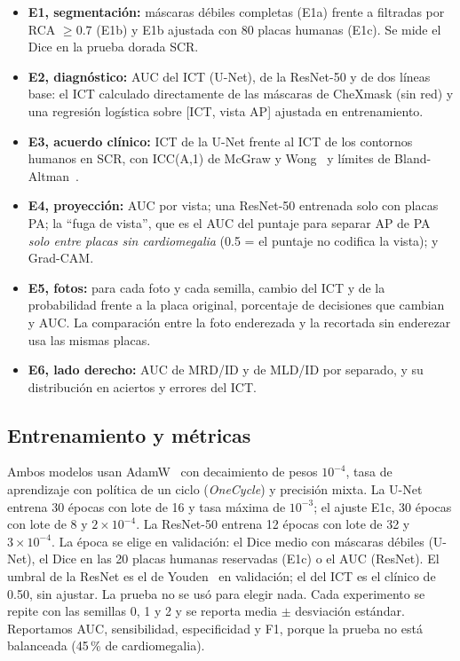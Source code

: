 \documentclass[conference]{IEEEtran}
\begin{document}
\begin{itemize}
\item \textbf{E1, segmentación:} máscaras débiles completas (E1a) frente a filtradas por RCA $\geq0.7$ (E1b) y E1b
  ajustada con 80 placas humanas (E1c). Se mide el Dice en la prueba dorada SCR.
\item \textbf{E2, diagnóstico:} AUC del ICT (U-Net), de la ResNet-50 y de dos líneas base: el ICT calculado
  directamente de las máscaras de CheXmask (sin red) y una regresión logística sobre [ICT, vista AP] ajustada en
  entrenamiento.
\item \textbf{E3, acuerdo clínico:} ICT de la U-Net frente al ICT de los contornos humanos en SCR, con ICC(A,1)
  de McGraw y Wong~\cite{mcgraw1996icc} y límites de Bland-Altman~\cite{bland1986agreement}.
\item \textbf{E4, proyección:} AUC por vista; una ResNet-50 entrenada solo con placas PA; la ``fuga de vista'', que es
  el AUC del puntaje para separar AP de PA \emph{solo entre placas sin cardiomegalia} (0.5 = el puntaje no codifica la
  vista); y Grad-CAM.
\item \textbf{E5, fotos:} para cada foto y cada semilla, cambio del ICT y de la probabilidad frente a la placa original,
  porcentaje de decisiones que cambian y AUC. La comparación entre la foto enderezada y la recortada sin enderezar usa
  las mismas placas.
\item \textbf{E6, lado derecho:} AUC de MRD/ID y de MLD/ID por separado, y su distribución en aciertos y errores del
  ICT.
\end{itemize}

\subsection{Entrenamiento y métricas}

Ambos modelos usan AdamW~\cite{loshchilov2019adamw} con decaimiento de pesos $10^{-4}$, tasa de aprendizaje con
política de un ciclo (\emph{OneCycle}) y precisión mixta. La U-Net entrena 30 épocas con lote de 16 y tasa máxima de
$10^{-3}$; el ajuste E1c, 30 épocas con lote de 8 y $2\times10^{-4}$. La ResNet-50 entrena 12 épocas con lote de 32 y
$3\times10^{-4}$. La época se elige en validación: el Dice medio con máscaras débiles (U-Net), el Dice en las 20 placas
humanas reservadas (E1c) o el AUC (ResNet). El umbral de la ResNet es el de Youden~\cite{youden1950index} en
validación; el del ICT es el clínico de 0.50, sin ajustar. La prueba no se usó para elegir nada. Cada experimento se
repite con las semillas 0, 1 y 2 y se reporta media $\pm$ desviación estándar. Reportamos AUC, sensibilidad,
especificidad y F1, porque la prueba no está balanceada (45\,\% de cardiomegalia).
\end{document}
